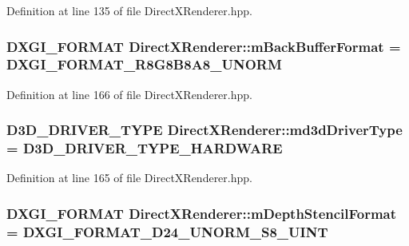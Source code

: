 Definition at line 135 of file Direct\+X\+Renderer.\+hpp.

\subsubsection[{\texorpdfstring{m\+Back\+Buffer\+Format}{mBackBufferFormat}}]{\setlength{\rightskip}{0pt plus 5cm}D\+X\+G\+I\+\_\+\+F\+O\+R\+M\+AT Direct\+X\+Renderer\+::m\+Back\+Buffer\+Format = D\+X\+G\+I\+\_\+\+F\+O\+R\+M\+A\+T\+\_\+\+R8\+G8\+B8\+A8\+\_\+\+U\+N\+O\+RM\hspace{0.3cm}{\ttfamily [protected]}}\hypertarget{class_direct_x_renderer_a10f81ee4e50481b1d5589f72fb5698f4_a10f81ee4e50481b1d5589f72fb5698f4}{}\label{class_direct_x_renderer_a10f81ee4e50481b1d5589f72fb5698f4_a10f81ee4e50481b1d5589f72fb5698f4}


Definition at line 166 of file Direct\+X\+Renderer.\+hpp.

\subsubsection[{\texorpdfstring{md3d\+Driver\+Type}{md3dDriverType}}]{\setlength{\rightskip}{0pt plus 5cm}D3\+D\+\_\+\+D\+R\+I\+V\+E\+R\+\_\+\+T\+Y\+PE Direct\+X\+Renderer\+::md3d\+Driver\+Type = D3\+D\+\_\+\+D\+R\+I\+V\+E\+R\+\_\+\+T\+Y\+P\+E\+\_\+\+H\+A\+R\+D\+W\+A\+RE\hspace{0.3cm}{\ttfamily [protected]}}\hypertarget{class_direct_x_renderer_a34c803e7e620ca5b73fe994fd278611c_a34c803e7e620ca5b73fe994fd278611c}{}\label{class_direct_x_renderer_a34c803e7e620ca5b73fe994fd278611c_a34c803e7e620ca5b73fe994fd278611c}


Definition at line 165 of file Direct\+X\+Renderer.\+hpp.

\subsubsection[{\texorpdfstring{m\+Depth\+Stencil\+Format}{mDepthStencilFormat}}]{\setlength{\rightskip}{0pt plus 5cm}D\+X\+G\+I\+\_\+\+F\+O\+R\+M\+AT Direct\+X\+Renderer\+::m\+Depth\+Stencil\+Format = D\+X\+G\+I\+\_\+\+F\+O\+R\+M\+A\+T\+\_\+\+D24\+\_\+\+U\+N\+O\+R\+M\+\_\+\+S8\+\_\+\+U\+I\+NT\hspace{0.3cm}{\ttfamily [protected]}}\hypertarget{class_direct_x_renderer_a1f7901ccfc61d85b80f94d7de0fef163_a1f7901ccfc61d85b80f94d7de0fef163}{}\label{class_direct_x_renderer_a1f7901ccfc61d85b80f94d7de0fef163_a1f7901ccfc61d85b80f94d7de0fef163}


